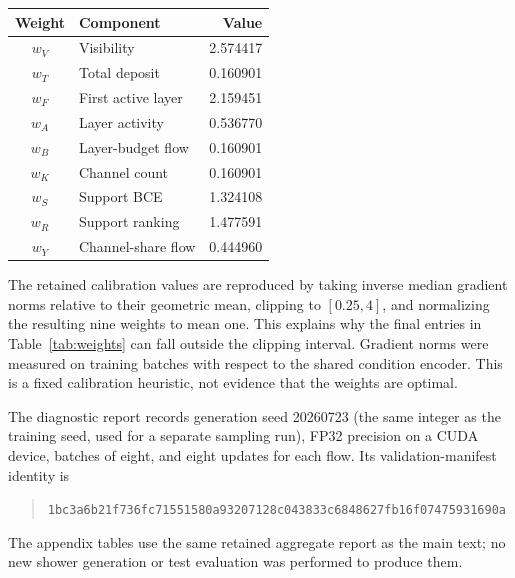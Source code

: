 \documentclass[11pt]{article}
\begin{document}
\begin{center}
\begin{minipage}{0.82\linewidth}
\centering
{}
\label{tab:weights}
\small
\begin{tabular}{@{}clr@{}}
\toprule
Weight & Component & Value \\
\midrule
$w_{V}$ & Visibility & 2.574417 \\
$w_{T}$ & Total deposit & 0.160901 \\
$w_{F}$ & First active layer & 2.159451 \\
$w_{A}$ & Layer activity & 0.536770 \\
$w_{B}$ & Layer-budget flow & 0.160901 \\
$w_{K}$ & Channel count & 0.160901 \\
$w_{S}$ & Support BCE & 1.324108 \\
$w_{R}$ & Support ranking & 1.477591 \\
$w_{Y}$ & Channel-share flow & 0.444960 \\
\bottomrule
\end{tabular}
\end{minipage}
\end{center}

The retained calibration values are reproduced by taking inverse median gradient norms relative to their geometric mean, clipping to $[0.25,4]$, and normalizing the resulting nine weights to mean one. This explains why the final entries in Table~\ref{tab:weights} can fall outside the clipping interval. Gradient norms were measured on training batches with respect to the shared condition encoder. This is a fixed calibration heuristic, not evidence that the weights are optimal.

The diagnostic report records generation seed 20260723 (the same integer as the training seed, used for a separate sampling run), FP32 precision on a CUDA device, batches of eight, and eight updates for each flow. Its validation-manifest identity is
\begin{quote}\footnotesize\nolinkurl{1bc3a6b21f736fc71551580a93207128c043833c6848627fb16f07475931690a}\end{quote}
The appendix tables use the same retained aggregate report as the main text; no new shower generation or test evaluation was performed to produce them.
\end{document}
